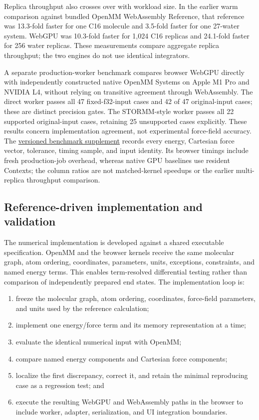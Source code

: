 \documentclass[11pt]{article}
\begin{document}
\begin{small}
Replica throughput also crosses over with workload size. In the earlier warm comparison against bundled OpenMM WebAssembly Reference, that reference was 13.3-fold faster for one C16 molecule and 3.5-fold faster for one 27-water system. WebGPU was 10.3-fold faster for 1,024 C16 replicas and 24.1-fold faster for 256 water replicas. These measurements compare aggregate replica throughput; the two engines do not use identical integrators.

A separate production-worker benchmark compares browser WebGPU directly with independently constructed native OpenMM Systems on Apple M1 Pro and NVIDIA L4, without relying on transitive agreement through WebAssembly. The direct worker passes all 47 fixed-f32-input cases and 42 of 47 original-input cases; these are distinct precision gates. The STORMM-style worker passes all 22 supported original-input cases, retaining 25 unsupported cases explicitly. These results concern implementation agreement, not experimental force-field accuracy. The \href{https://github.com/rafwiewiora/molarium/tree/2ab30383d6160349aa3b1e980f7239d6854b329d/benchmarks/simulation}{versioned benchmark supplement} records every energy, Cartesian force vector, tolerance, timing sample, and input identity. Its browser timings include fresh production-job overhead, whereas native GPU baselines use resident Contexts; the column ratios are not matched-kernel speedups or the earlier multi-replica throughput comparison.

\subsection{Reference-driven implementation and validation}

The numerical implementation is developed against a shared executable specification. OpenMM and the browser kernels receive the same molecular graph, atom ordering, coordinates, parameters, units, exceptions, constraints, and named energy terms. This enables term-resolved differential testing rather than comparison of independently prepared end states. The implementation loop is:

\begin{enumerate}[leftmargin=*]
\item freeze the molecular graph, atom ordering, coordinates, force-field parameters, and units used by the reference calculation;
\item implement one energy/force term and its memory representation at a time;
\item evaluate the identical numerical input with OpenMM;
\item compare named energy components and Cartesian force components;
\item localize the first discrepancy, correct it, and retain the minimal reproducing case as a regression test; and
\item execute the resulting WebGPU and WebAssembly paths in the browser to include worker, adapter, serialization, and UI integration boundaries.
\end{enumerate}


\end{small}
\end{document}
